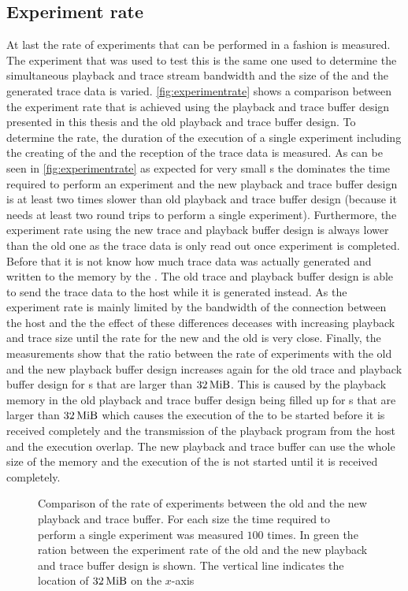 \subsection{Experiment rate}
At last the rate of experiments that can be performed in a \HWinTheLoop{} fashion is measured. The experiment that was used to test this is the same one used to determine the simultaneous playback and trace stream bandwidth and the size of the \PlaybackProgram{} and the generated trace data is varied. \autoref{fig:experimentrate} shows a comparison between the experiment rate that is achieved using the playback and trace buffer design presented in this thesis and the old playback and trace buffer design. To determine the rate, the duration of the execution of a single experiment including the creating of the \PlaybackProgram{} and the reception of the trace data is measured. As can be seen in \autoref{fig:experimentrate} as expected for very small \PlaybackProgram{}s the \rtt{} dominates the time required to perform an experiment and the new playback and trace buffer design is at least two times slower than old playback and trace buffer design (because it needs at least two round trips to perform a single experiment). Furthermore, the experiment rate using the new trace and playback buffer design is always lower than the old one as the trace data is only read out once experiment is completed. Before that it is not know how much trace data was actually generated and written to the \DDR{} memory by the \AXIDMA{}. The old trace and playback buffer design is able to send the trace data to the host while it is generated instead. As the experiment rate is mainly limited by the bandwidth of the connection between the host and the \FPGA{} the effect of these differences deceases with increasing playback and trace size until the rate for the new and the old is very close.
Finally, the measurements show that the ratio between the rate of experiments with the old and the new playback buffer design increases again for the old trace and playback buffer design for \PlaybackProgram{}s that are larger than $\SI{32}{\mebi\byte}$. This is caused by the playback memory in the old playback and trace buffer design being filled up for \PlaybackProgram{}s that are larger than $\SI{32}{\mebi\byte}$ which causes the execution of the \PlaybackProgram{} to be started before it is received completely and the transmission of the playback program from the host and the execution overlap. The new playback and trace buffer can use the whole size of the \DDR{} memory and the execution of the \PlaybackProgram{} is not started until it is received completely.
\begin{figure}[H]
\caption{Comparison of the rate of experiments between the old and the new playback and trace buffer. For each size the time required to perform a single experiment was measured $\num{100}$ times. In green the ration between the experiment rate of the old and the new playback and trace buffer design is shown. The vertical line indicates the location of $\SI{32}{\mebi\byte}$ on the $x$-axis}\label{fig:experimentrate}
\end{figure}

